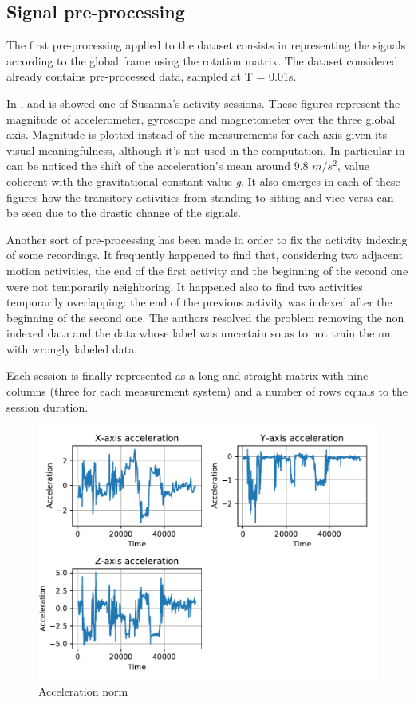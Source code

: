 \subsection{Signal pre-processing}
The first pre-processing applied to the dataset consists in representing the signals according to the global frame using the rotation matrix. The dataset considered already contains pre-processed data, sampled at T = 0.01s.

In ,  and  is showed one of Susanna's activity sessions. These figures represent the magnitude of accelerometer, gyroscope and magnetometer over the three global axis. Magnitude is plotted instead of the measurements for each axis given its visual meaningfulness, although it's not used in the computation. In particular in  can be noticed the shift of the acceleration's mean around 9.8 $m/s^2$, value coherent with the gravitational constant value \textit{g}. It also emerges in each of these figures how the transitory activities from standing to sitting and vice versa can be seen due to the drastic change of the signals.

Another sort of pre-processing has been made in order to fix the activity indexing of some recordings. It frequently happened to find that, considering two adjacent motion activities, the end of the first activity and the beginning of the second one were not temporarily neighboring. It happened also to find two activities temporarily overlapping: the end of the previous activity was indexed after the beginning of the second one.
The authors resolved the problem removing the non indexed data and the data whose label was uncertain so as to not train the \gls{nn} with wrongly labeled data.

Each session is finally represented as a long and straight matrix with nine columns (three for each measurement system) and a number of rows equals to the session duration.

\begin{figure}[htp]
\includegraphics[scale=0.55]{acceleration_susanna.pdf}
\caption{Acceleration norm}
\label{fig:acc}
\end{figure}

